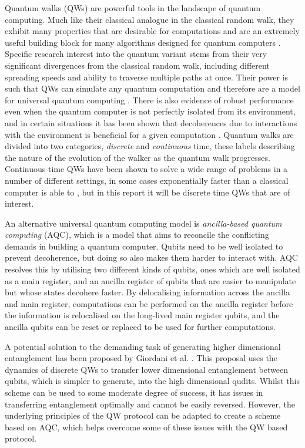 Quantum walks (QWs) are powerful tools in the landscape of quantum computing. 
Much like their classical analogue in the classical random walk, they exhibit many properties that are desirable for computations and are an extremely useful building block for many algorithms designed for quantum computers \cite{shenvi2003}. 
Specific research interest into the quantum variant stems from their very significant divergences from the classical random walk, including different spreading speeds and ability to traverse multiple paths at once. 
Their power is such that QWs can simulate any quantum computation and therefore are a model for universal quantum computing \cite{Childs_2009}.
There is also evidence of robust performance even when the quantum computer is not perfectly isolated from its environment, and in certain situations it has been shown that decoherences due to interactions with the environment is beneficial for a given computation \cite{KENDON_2007}.
Quantum walks are divided into two categories, \emph{discrete} and \emph{continuous} time, these labels describing the nature of the evolution of the walker as the quantum walk progresses.
Continuous time QWs have been shown to solve a wide range of problems in a number of different settings, in some cases exponentially faster than a classical computer is able to \cite{Childs_2003}, but in this report it will be discrete time QWs that are of interest. 

An alternative universal quantum computing model is \emph{ancilla-based quantum computing} (AQC), which is a model that aims to reconcile the conflicting demands in building a quantum computer.
Qubits need to be well isolated to prevent decoherence, but doing so also makes them harder to interact with.
AQC resolves this by utilising two different kinds of qubits, ones which are well isolated as a main register, and an ancilla register of qubits that are easier to manipulate but whose states decohere faster.
By delocalising information across the ancilla and main register, computations can be performed on the ancilla register before the information is relocalised on the long-lived main register qubits, and the ancilla qubits can be reset or replaced to be used for further computations.

A potential solution to the demanding task of generating higher dimensional entanglement has been proposed by Giordani et al. \cite{giordani2020}.
This proposal uses the dynamics of discrete QWs to transfer lower dimensional entanglement between qubits, which is simpler to generate, into the high dimensional qudits.
Whilst this scheme can be used to some moderate degree of success, it has issues in transferring entanglement optimally and cannot be easily reversed.
However, the underlying principles of the QW protocol can be adapted to create a scheme based on AQC, which helps overcome some of these issues with the QW based protocol.


